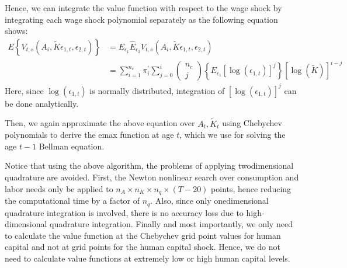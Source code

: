 \documentclass{article}
\begin{document}
Hence, we can integrate the value function with respect to the wage shock by integrating each wage shock polynomial separately as the following equation shows:
$$
\begin{aligned}
E\left\{V_{t, s}\left(A_i, \tilde{K} \epsilon_{1, t}, \epsilon_{2, t}\right)\right\} &=E_{\epsilon_1} \hat{E}_{\epsilon_2} V_{t, s}\left(A_i, \tilde{K} \epsilon_{1, t}, \epsilon_{2, t}\right) \\
&=\sum_{i=1}^{n_c} \pi_i^{\prime} \sum_{j=0}^i\left(\begin{array}{c}
n_c \\
j
\end{array}\right)\left\{E_{\epsilon_1}\left[\log \left(\epsilon_{1, t}\right)\right]^j\right\}[\log (\tilde{K})]^{i-j}
\end{aligned}
$$
Here, since $\log \left(\epsilon_{1, t}\right)$ is normally distributed, integration of $\left[\log \left(\epsilon_{1, t}\right)\right]^j$ can be done analytically.\par
\medskip
Then, we again approximate the above equation over $A_t, \tilde{K}_t$ using Chebychev polynomials to derive the emax function at age $t$, which we use for solving the age $t-1$ Bellman equation. \par
Notice that using the above algorithm, the problems of applying twodimensional quadrature are avoided. First, the Newton nonlinear search over consumption and labor needs only be applied to $n_A \times n_K \times n_q \times(T-20)$ points, hence reducing the computational time by a factor of $n_q$. Also, since only onedimensional quadrature integration is involved, there is no accuracy loss due to high-dimensional quadrature integration. Finally and most importantly, we only need to calculate the value function at the Chebychev grid point values for human capital and not at grid points for the human capital shock. Hence, we do not need to calculate value functions at extremely low or high human capital levels.
\end{document}
